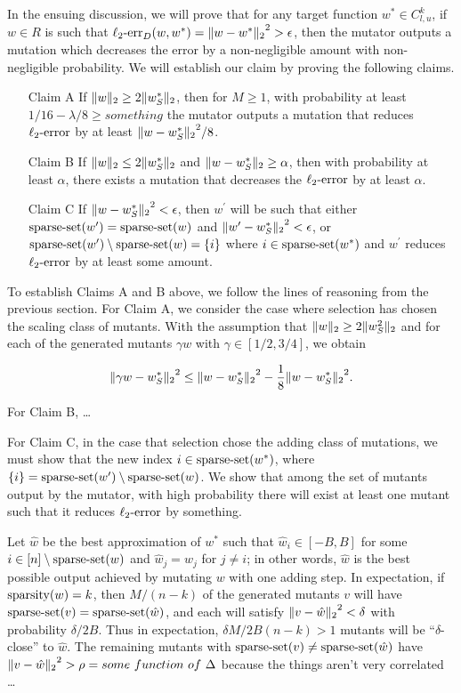 In the ensuing discussion, we will prove that for any target function
$w^* \in C^k_{l,u}$, if $w \in R$ is such that
$\mathrm{\ell_2\mbox{-}err}_D(w, w^*) = {\Vert w - w^* \Vert_{2}}^2 > \epsilon$,
then the mutator outputs a mutation which decreases the error by a
non-negligible amount with non-negligible probability.
We will establish our claim by proving the following claims.

\begin{enumerate}
\item[Claim A] If ${\Vert w \Vert_{2}} \ge 2 {\Vert w^*_S \Vert_{2}}$, then for $M \ge 1$,
with probability at least $1/16 - \lambda/8 \ge something$ the mutator outputs
a mutation that reduces $\mathrm{\ell_2\mbox{-}error}$ by at least ${\Vert w - w^*_S \Vert_{2}}^2 / 8$.
\item[Claim B] If ${\Vert w \Vert_{2}} \le 2 {\Vert w^*_S \Vert_{2}}$ and
${\Vert w - w^*_S \Vert_{2}} \ge \alpha$, then with probability at least $\alpha$,
there exists a mutation that decreases the $\mathrm{\ell_2\mbox{-}error}$ by at least $\alpha$.
\item[Claim C] If ${\Vert w - w^*_S \Vert_{2}}^2 < \epsilon$, then $w^\prime$ will be
such that either $\mathrm{sparse\mbox{-}set}(w^\prime) = \mathrm{sparse\mbox{-}set}(w)$ and
${\Vert w^\prime - w^*_S \Vert_{2}}^2 < \epsilon$, or
$\mathrm{sparse\mbox{-}set}(w^\prime) \setminus \mathrm{sparse\mbox{-}set}(w) = \{i\}$ where $i \in \mathrm{sparse\mbox{-}set}(w^*)$
and $w^\prime$ reduces $\mathrm{\ell_2\mbox{-}error}$ by at least some amount.
\end{enumerate}

To establish Claims A and B above, we follow the lines of reasoning from the
previous section.
For Claim A, we consider the case where selection has chosen the scaling class
of mutants.  With the assumption that ${\Vert w \Vert_{2}} \ge 2 {\Vert w_S^2 \Vert_{2}}$ and
for each of the generated mutants $\gamma w$ with $\gamma \in [1/2, 3/4]$,
we obtain

\[
{\Vert \gamma w - w^*_S \Vert_{2}}^2 \le {\Vert w - w^*_S \Vert_{2}}^2 - \frac{1}{8}{\Vert w - w^*_S \Vert_{2}}^2.
\]

For Claim B, \dots

For Claim C, in the case that selection chose the adding class of mutations,
we must show that the new index $i \in \mathrm{sparse\mbox{-}set}(w^*)$, where
$\{i\} = \mathrm{sparse\mbox{-}set}(w^\prime) \setminus \mathrm{sparse\mbox{-}set}(w)$.
We show that among the set of mutants output by the mutator, with high probability
there will exist at least one mutant such that it reduces $\mathrm{\ell_2\mbox{-}error}$ by something.

Let $\hat{w}$ be the best approximation of $w^*$ such that $\hat{w}_i \in [-B, B]$
for some $i \in [n] \setminus \mathrm{sparse\mbox{-}set}(w)$ and $\hat{w}_j = w_j$ for $j \neq i$;
in other words, $\hat{w}$ is the best possible output achieved by mutating $w$ with
one adding step.
In expectation, if $\mathrm{sparsity}(w) = k$, then $M / (n - k)$ of the generated mutants
$v$ will have $\mathrm{sparse\mbox{-}set}(v) = \mathrm{sparse\mbox{-}set}(\hat{w})$, and each will satisfy
${\Vert v - \hat{w} \Vert_{2}}^2 < \delta$ with probability $\delta/2B$.
Thus in expectation, $\delta M / 2B(n - k) > 1$ mutants will be
``$\delta$-close'' to $\hat{w}$.
The remaining mutants with $\mathrm{sparse\mbox{-}set}(v) \neq \mathrm{sparse\mbox{-}set}(\hat{w})$ have
${\Vert v - \hat{w} \Vert_{2}}^2 > \rho = some~function~of~\Delta$
because the things aren't very correlated \dots

